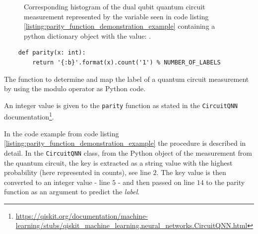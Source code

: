 \begin{figure}[!h]
    \centering
    \caption{Corresponding histogram of the dual qubit quantum circuit measurement represented by the variable seen in code listing \ref{listing:parity_function_demonstration_example} containing a python dictionary object with the value: .}
    \label{figure:parity_function_example_histogram}
\end{figure}

\begin{listing}[!ht]
    \begin{verbatim}
    def parity(x: int):
        return '{:b}'.format(x).count('1') % NUMBER_OF_LABELS
    \end{verbatim}
    \caption{The  function to determine and map the label of a quantum circuit measurement by using the modulo operator as Python code.}
    \label{listing:parity_function}
\end{listing}

An integer value is given to the \texttt{parity} function as stated in the \texttt{CircuitQNN} documentation\footnote{\url{https://qiskit.org/documentation/machine-learning/stubs/qiskit_machine_learning.neural_networks.CircuitQNN.html}}. 

In the code example from code listing \ref{listing:parity_function_demonstration_example} the procedure is described in detail. In the \texttt{CircuitQNN} class, from the Python object of the measurement from the quantum circuit, the key is extracted as a string value with the highest probability (here represented in counts), see line $2$. The key value is then converted to an integer value - line $5$ - and then passed on line $14$ to the parity function as an argument to predict the \textit{label}.

